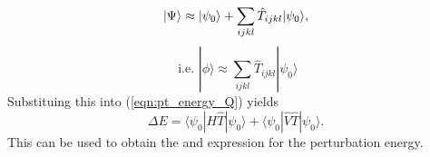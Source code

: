 \documentclass[12pt]{article}
\begin{document}
\begin{equation}
\begin{equation}
|\Psi \rangle \approx |\psi_{0} \rangle + \sum_{ijkl} \hat{T}_{ijkl} |\psi_{0} \rangle,
\end{equation}
\begin{equation}
\text{\ \ \ i.e. \ \ \ } | \phi \rangle \approx \sum_{ijkl} \hat{T}_{ijkl} |\psi_{0} \rangle 
\end{equation}
Substituing this into (\ref{eqn:pt_energy_Q}) yields 
\begin{equation}
\Delta E = \langle \psi_{0} | H \hat{T}| \psi_{0} \rangle + \langle \psi_{0} | \hat{V}\hat{T}| \psi_{0} \rangle . 
\label{eqn:pt_energy_T}
\end{equation}
This can be used to obtain the and expression for the perturbation energy.


\end{document}
